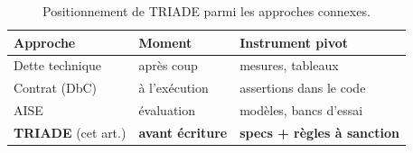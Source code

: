 \begin{table}[t]
\centering\small
\caption{Positionnement de TRIADE parmi les approches connexes.}
\label{tab:position}
\begin{tabularx}{\columnwidth}{@{}l Y Y@{}}
\toprule
Approche & Moment & Instrument pivot \\
\midrule
Dette technique \cite{li2015} & après coup & mesures, tableaux \\
Contrat (DbC) \cite{meyer1992} & à l’exécution & assertions dans le code \\
AISE \cite{hou2024} & évaluation & modèles, bancs d’essai \\
\textbf{TRIADE} (cet art.) & \textbf{avant écriture} & \textbf{specs + règles
à sanction} \\
\bottomrule
\end{tabularx}
\end{table}
